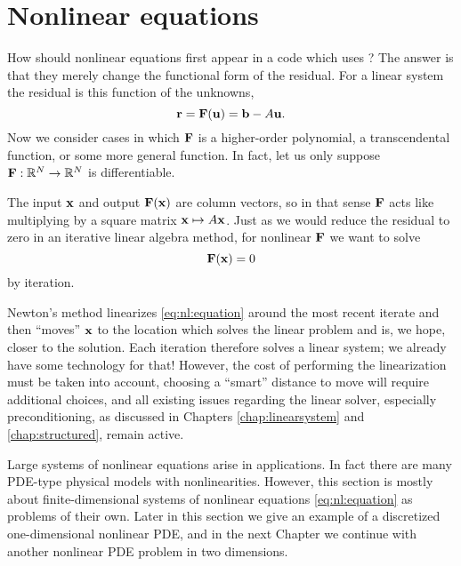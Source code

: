 \renewcommand{\CODELOC}{c/ch4/}

\chapter{Nonlinear equations}
\label{chap:nonlinear}


How should nonlinear equations first appear in a code which uses \PETSc?  The answer is that they merely change the functional form of the residual.  For a linear system the residual is this function of the unknowns,
\begin{equation}
\mathbf{r} = \mathbf{F}(\mathbf{u}) = \mathbf{b} - A \mathbf{u}. \label{eq:nl:linres}
\end{equation}
Now we consider cases in which $\mathbf{F}$ is a higher-order polynomial, a transcendental function, or some more general function.  In fact, let us only suppose $\mathbf{F} : \mathbb{R}^N \to \mathbb{R}^N$ is differentiable.

The input $\mathbf{x}$ and output $\mathbf{F}(\mathbf{x})$ are column vectors, so in that sense $\mathbf{F}$ acts like multiplying by a square matrix $\mathbf{x}\mapsto A\mathbf{x}$.  Just as we would reduce the residual to zero in an iterative linear algebra method, for nonlinear $\mathbf{F}$ we want to solve
\begin{equation}
   \mathbf{F}(\mathbf{x}) = 0   \label{eq:nl:equation}
\end{equation}
by iteration.

Newton's method linearizes \eqref{eq:nl:equation} around the most recent iterate and then ``moves'' $\mathbf{x}$ to the location which solves the linear problem and is, we hope, closer to the solution.  Each iteration therefore solves a linear system; we already have some \PETSc technology for that!  However, the cost of performing the linearization must be taken into account, choosing a ``smart'' distance to move will require additional choices, and all existing issues regarding the linear solver, especially preconditioning, as discussed in Chapters \ref{chap:linearsystem} and \ref{chap:structured}, remain active.

Large systems of nonlinear equations arise in applications.  In fact  there are many PDE-type physical models with nonlinearities.  However, this section is mostly about finite-dimensional systems of nonlinear equations \eqref{eq:nl:equation} as problems of their own.  Later in this section we give an example of a discretized one-dimensional nonlinear PDE, and in the next Chapter we continue with another nonlinear PDE problem in two dimensions.


